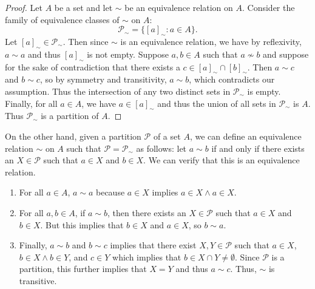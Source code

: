 \begin{proof}
    Let \(A\) be a set and let \(\sim\) be an equivalence relation on \(A\).
    Consider the family of equivalence classes of \(\sim\) on \(A\):
    \[
        \mathcal{P}_{\sim} = \{[a]_{\sim} : a \in A\}.
    \]
    Let \([a]_{\sim} \in \mathcal{P}_{\sim}\). Then since \(\sim\) is an
    equivalence relation, we have by reflexivity, \(a \sim a\) and thus
    \([a]_{\sim}\) is not empty. Suppose \(a, b \in A\) such that \(a\not\sim
    b\) and suppose for the sake of contradiction that there exists a \(c \in
    [a]_{\sim} \cap [b]_{\sim}\). Then \(a \sim c\) and \(b \sim c\), so by
    symmetry and transitivity, \(a \sim b\), which contradicts our assumption.
    Thus the intersection of any two distinct sets in \(\mathcal{P}_{\sim}\) is
    empty. Finally, for all \(a \in A\), we have \(a \in [a]_{\sim}\) and thus
    the union of all sets in \(\mathcal{P}_{\sim}\) is \(A\). Thus
    \(\mathcal{P}_{\sim}\) is a partition of \(A\).
\end{proof}

On the other hand, given a partition \(\mathcal{P}\) of a set \(A\), we can
define an equivalence relation \(\sim\) on \(A\) such that \(\mathcal{P} =
\mathcal{P}_{\sim}\) as follows: let \(a \sim b\) if and only if there exists an
\(X \in \mathcal{P}\) such that \(a \in X\) and \(b \in X\). We can verify that
this is an equivalence relation.
\begin{enumerate}[label=(\alph*), wide, itemsep=0pt]
    \item For all \(a \in A\), \(a \sim a\) because \(a \in X\) implies \(a \in
    X \land a \in X\).
    \item For all \(a, b \in A\), if \(a \sim b\), then there exists an \(X \in
    \mathcal{P}\) such that \(a \in X\) and \(b \in X\). But this implies that
    \(b \in X\) and \(a \in X\), so \(b \sim a\).
    \item Finally, \(a \sim b\) and \(b \sim c\) implies that there exist \(X, Y
    \in \mathcal{P}\) such that \(a \in X\), \(b \in X \land b \in Y\), and \(c
    \in Y\) which implies that \(b \in X \cap Y \neq \emptyset\). Since
    \(\mathcal{P}\) is a partition, this further implies that \(X = Y\) and thus
    \(a \sim c\). Thus, \(\sim\) is transitive.
\end{enumerate}

